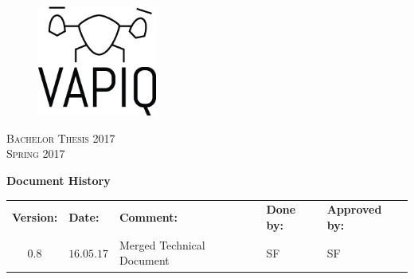 \documentclass{report}
\author{Aleksander Holthe  \\ Katrine Sundal Haune \\ Kent Kjeldaas \\ Stian Fredriksen \\ Tomas Lyngroth \\ Vanja Katinka Halvorsen}
\makeatletter
\let\vapiqteam\@author
\makeatother
\begin{document}
\begin{titlepage}
    \centering
    \pagecolor{gainsboro}
	\\[3.0 cm]
    \begin{figure}[h]
        \centering
        \includegraphics[width = 0.35\textwidth]{VAPIQ-PICTURES//Logo2_Tilted.png}
        \\[2.0 cm] 
    \end{figure}                              
    \textsc{\Huge Bachelor Thesis 2017}  
    \\[1 cm]
    \textsc{\Large Spring 2017}   
    \\[3.0 cm]
	\large \vapiqteam      
\end{titlepage}
\pagecolor{white}

\begin{center}
\textbf{\large Document History}\\
\vspace*{0.2cm}
\begin{tabular}{cllll}
\rowcolor{cadetgrey}
\textbf{Version:}    &\textbf{Date:} 	 &\textbf{Comment:}    &\textbf{Done by:}   &\textbf{Approved by:}  \\
0.8       & $16.05.17$       & Merged Technical Document  & SF    & SF  
\end{tabular}                                                                   
\end{center}
\end{document}
